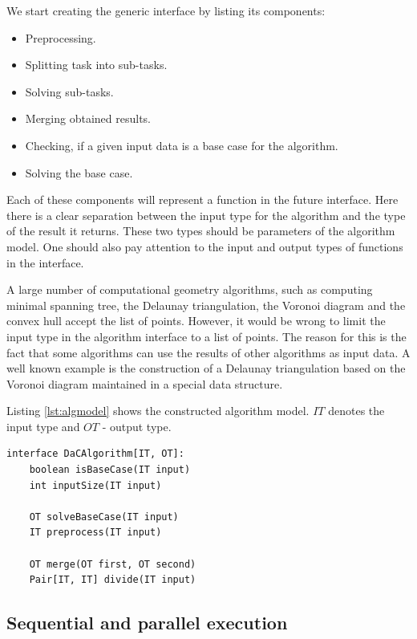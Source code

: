 \documentclass[a4paper,english,numberwithinsect,notab]{eurocg20-submission}
\begin{document}
	We start creating the generic interface by listing its components:
	
	\begin{itemize}
		\item 
		Preprocessing.
		\item 
		Splitting task into sub-tasks.
		\item 
		Solving sub-tasks.
		\item 
		Merging obtained results.
		\item 
		Checking, if a given input data is a base case for the algorithm.
		\item 
		Solving the base case.
	\end{itemize}
	
	Each of these components will represent a function in the future interface. Here there is a clear separation between the input type for the algorithm and the type of the result it returns. These two types should be parameters of the algorithm model. One should also pay attention to the input and output types of functions  in the interface.
	
	A large number of computational geometry algorithms, such as computing minimal spanning tree, the Delaunay triangulation, the Voronoi diagram and the convex hull accept the list of points. However, it would be wrong to limit the input type in the algorithm interface to a list of points. The reason for this is the fact that some algorithms can use the results of other algorithms as input data. A well known example is the construction of a Delaunay triangulation based on the Voronoi diagram maintained in a special data structure.
	
	Listing \ref{lst:algmodel} shows the constructed algorithm model. $IT$ denotes the input type and $OT$ - output type.
	
	\begin{lstlisting}[caption={Algorithm model based on the ``divide-and-conquer'' principle},label={lst:algmodel},captionpos=t,float,abovecaptionskip=-\medskipamount]
interface DaCAlgorithm[IT, OT]:
    boolean isBaseCase(IT input)
    int inputSize(IT input)

    OT solveBaseCase(IT input)
    IT preprocess(IT input)

    OT merge(OT first, OT second)
    Pair[IT, IT] divide(IT input)
	\end{lstlisting}
	
	
\subsection{Sequential and parallel execution}
	
\end{document}
